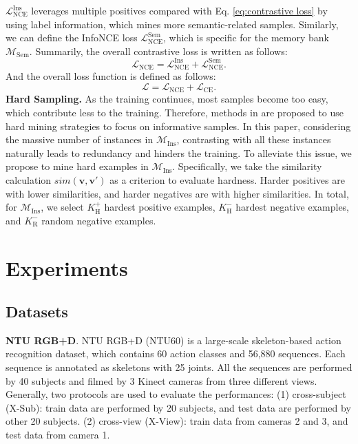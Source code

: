 \documentclass{article} \usepackage{iclr2023_conference,times}
\begin{document}
$\mathcal{L}_\text{NCE}^\text{Ins}$ leverages multiple positives compared with Eq. \ref{eq:contrastive loss} by using label information, which mines more semantic-related samples. Similarly, we can define the InfoNCE loss $\mathcal{L}_\text{NCE}^\text{Sem}$, which is specific for the memory bank $\mathcal{M}_\text{Sem}$. Summarily, the overall contrastive loss is written as follows:
\begin{equation}
    \mathcal{L}_\text{NCE} = \mathcal{L}_\text{NCE}^\text{Ins} + \mathcal{L}_\text{NCE}^\text{Sem}.
\end{equation}
And the overall loss function is defined as follows:
\begin{equation}
    \mathcal{L} = \mathcal{L}_\text{NCE} + \mathcal{L}_\text{CE}.
\end{equation}
\noindent \textbf{Hard Sampling.} As the training continues, most samples become too easy, which contribute less to the training. Therefore, methods in \citep{tabassum2022hard, hard1, hard2, cross-sequence-semantic} are proposed to use hard mining strategies to focus on informative samples. In this paper, considering the massive number of instances in $\mathcal{M}_\text{Ins}$, contrasting with all these instances naturally leads to redundancy and hinders the training. To alleviate this issue, we propose to mine hard examples in $\mathcal{M}_\text{Ins}$. Specifically, we take the similarity calculation $sim(\mathbf{v},\mathbf{v'})$ as a criterion to evaluate hardness. Harder positives are with lower similarities, and harder negatives are with higher similarities. In total, for $\mathcal{M}_\text{Ins}$, we select $K_\text{H}^+$ hardest positive examples, $K_\text{H}^-$ hardest negative examples, and $K_\text{R}^-$ random negative examples.

\section{Experiments}
\subsection{Datasets}
\textbf{NTU RGB+D}. NTU RGB+D (NTU60) \citep{ntu60} is a large-scale skeleton-based action recognition dataset, which contains 60 action classes and 56,880 sequences. Each sequence is annotated as skeletons with 25 joints. All the sequences are performed by 40 subjects and filmed by 3 Kinect cameras from three different views. Generally, two protocols are used to evaluate the performances: (1) cross-subject (X-Sub): train data are performed by 20 subjects, and test data are performed by other 20 subjects. (2) cross-view (X-View): train data from cameras 2 and 3, and test data from camera 1.
\end{document}
